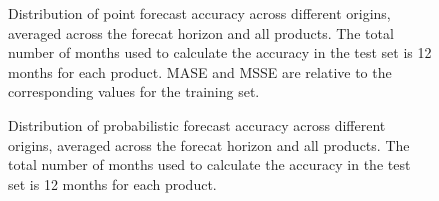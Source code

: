 \documentclass[
  authoryear,
  preprint,
  3p]{elsarticle}
\begin{document}
\begin{figure}[H]


\caption{\label{fig-point}Distribution of point forecast accuracy across
different origins, averaged across the forecat horizon and all products.
The total number of months used to calculate the accuracy in the test
set is 12 months for each product. MASE and MSSE are relative to the
corresponding values for the training set.}

\end{figure}%

\begin{figure}[H]


\caption{\label{fig-prob}Distribution of probabilistic forecast accuracy
across different origins, averaged across the forecat horizon and all
products. The total number of months used to calculate the accuracy in
the test set is 12 months for each product.}

\end{figure}%
\end{document}
